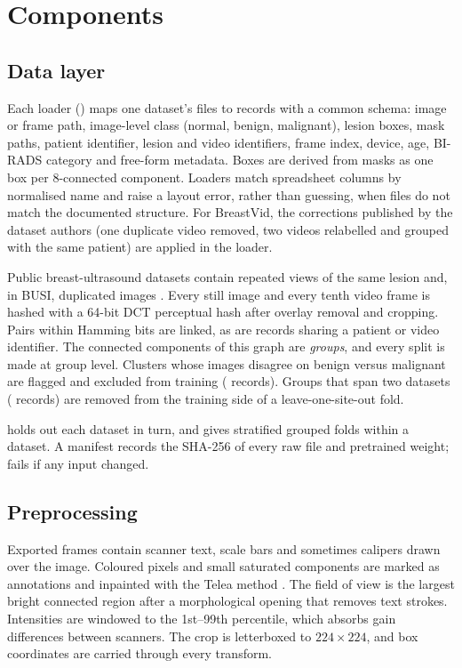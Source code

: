 \section{Components}\label{sec:components}

\subsection{Data layer}\label{sec:datalayer}
 Each loader () maps one dataset's files to records with a common schema: image or frame path, image-level class (normal, benign, malignant), lesion boxes, mask paths, patient identifier, lesion and video identifiers, frame index, device, age, BI-RADS category and free-form metadata. Boxes are derived from masks as one box per 8-connected component. Loaders match spreadsheet columns by normalised name and raise a layout error, rather than guessing, when files do not match the documented structure. For BreastVid, the corrections published by the dataset authors (one duplicate video removed, two videos relabelled and grouped with the same patient) are applied in the loader.

 Public breast-ultrasound datasets contain repeated views of the same lesion and, in BUSI, duplicated images \cite{busicritique}. Every still image and every tenth video frame is hashed with a 64-bit DCT perceptual hash after overlay removal and cropping. Pairs within \NDedupMaxHamming{} Hamming bits are linked, as are records sharing a patient or video identifier. The connected components of this graph are \emph{groups}, and every split is made at group level. Clusters whose images disagree on benign versus malignant are flagged and excluded from training (\NDiscordantRecords{} records). Groups that span two datasets (\NCrossSiteRecords{} records) are removed from the training side of a leave-one-site-out fold.

  holds out each dataset in turn, and  gives stratified grouped folds within a dataset. A manifest records the SHA-256 of every raw file and pretrained weight;  fails if any input changed.

\subsection{Preprocessing}
Exported frames contain scanner text, scale bars and sometimes calipers drawn over the image. Coloured pixels and small saturated components are marked as annotations and inpainted with the Telea method \cite{telea2004}. The field of view is the largest bright connected region after a morphological opening that removes text strokes. Intensities are windowed to the 1st--99th percentile, which absorbs gain differences between scanners. The crop is letterboxed to $224\times224$, and box coordinates are carried through every transform.

